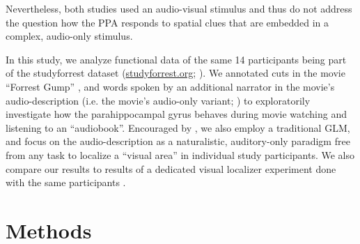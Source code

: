 \documentclass[english]{article}
\begin{document}
Nevertheless, both studies used an audio-visual stimulus and thus do not address
the question how the PPA responds to spatial clues that are embedded in a
complex, audio-only stimulus.


In this study, we analyze functional data of the same 14 participants being part
of the studyforrest dataset
(\href{http://www.studyforrest.org}{studyforrest.org};
\citep{hanke2014audiomovie, hanke2016simultaneous}).
We annotated cuts in the movie ``Forrest Gump'' \citep{ForrestGumpMovie}, and
words spoken by an additional narrator in the movie's audio-description (i.e.
the movie's audio-only variant; \citep{ForrestGumpGermanAD}) to exploratorily
investigate how the parahippocampal gyrus behaves during movie watching and
listening to an ``audiobook''.
Encouraged by \citep{aziz2008modulation}, we also employ a traditional GLM, and
focus on the audio-description as a naturalistic, auditory-only paradigm free
from any task to localize a ``visual area'' in individual study participants.
We also compare our results to results of a dedicated visual localizer
experiment done with the same participants \citep{sengupta2016extension}.



\section{Methods}

\end{document}
